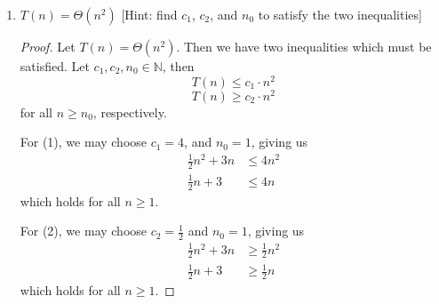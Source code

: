 \documentclass{article}
\begin{document}
\begin{enumerate}[label=(\alph*).]
\begin{proof}
            \begin{align*}
                \frac{1}{2}n^2 + 3n &\ge c \cdot n \\
            \end{align*}
            Suppose $c = 1$, and $n_0 = 1$. 
            \begin{align*}
                \frac{1}{2}n^2 + 3n &\ge n \\
                \frac{1}{2}n + 3    &\ge 1
            \end{align*}
            We can see that for all $n \ge 1$, $T(n) \ge n$. Thus, $T(n) = \Omega(n)$.
        \end{proof}
    \item $T(n) = \Theta(n^2)$ [Hint: find $c_1$, $c_2$, and $n_0$ to satisfy the two inequalities]
        \begin{proof}
            Let $T(n) = \Theta(n^2)$. Then we have two inequalities which must be satisfied.
            Let $c_1, c_2, n_0 \in \mathbb{N}$, then
            \begin{equation}
                T(n) \le c_1\cdot n^2
            \end{equation}
            \begin{equation}
                T(n) \ge c_2\cdot n^2
            \end{equation}
            for all $n \ge n_0$, respectively.


            For (1), we may choose $c_1 = 4$, and $n_0 = 1$, giving us
            \begin{align*}
                \frac{1}{2}n^2 + 3n &\le 4n^2\\
                \frac{1}{2}n + 3 &\le 4n
            \end{align*}
            which holds for all $n \ge 1$.
            

            For (2), we may choose $c_2 = \frac{1}{2}$ and $n_0 = 1$, giving us
            \begin{align*}
                \frac{1}{2}n^2 + 3n &\ge \frac{1}{2}n^2\\
                \frac{1}{2}n + 3 &\ge \frac{1}{2}n
            \end{align*}
            which holds for all $n \ge 1$.



\end{proof}
\end{enumerate}
\end{document}
